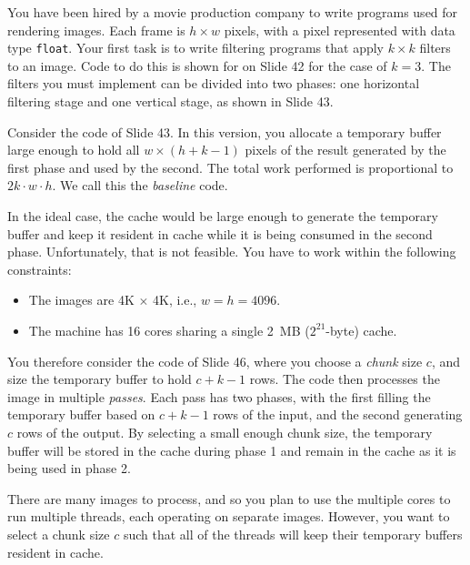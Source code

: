 \documentclass[11pt]{article}
\begin{document}
You have been hired by a movie production company to write programs
used for rendering images.  Each frame is $h \times w$ pixels, with a
pixel represented with data type \texttt{float}.  Your first task is
to write filtering programs that apply $k \times k$ filters to an
image.  Code to do this is shown for on Slide 42 for the case of
$k=3$.  The filters you must implement can be divided into two phases:
one horizontal filtering stage and one vertical stage, as shown in
Slide 43.

Consider the code of Slide 43.  In this version, you
allocate a temporary buffer large enough to hold all $w \times
(h+k-1)$ pixels of the result generated by the first phase and used by
the second.  The total work performed is proportional to $2k
\cdot w \cdot h$.  We call this the {\em baseline} code.

In the ideal case, the cache would be large enough to generate the
temporary buffer and keep it resident in cache while it is being
consumed in the second phase.
Unfortunately, that is not feasible.  You have to work within the following constraints:
\begin{itemize}
\item The images are 4K $\times$ 4K, i.e., $w = h = 4096$.
\item The machine has 16 cores sharing a single 2~MB ($2^{21}$-byte)
cache.
\end{itemize}

You therefore consider the code of Slide 46, where you choose a {\em
  chunk} size $c$, and size the temporary buffer to hold $c + k-1$
rows.  The code then processes the image in multiple {\em passes}.
Each pass has two phases, with the first filling the temporary buffer
based on $c+k-1$ rows of the input, and the second generating $c$ rows
of the output.  By selecting a small enough chunk size, the temporary
buffer will be stored in the cache during phase 1 and remain in the
cache as it is being used in phase 2.

There are many images to process, and so you plan to use the multiple
cores to run multiple threads, each operating on separate images.
However, you want to select a chunk size $c$ such that all of the
threads will keep their temporary buffers resident in cache.

\newpage
\end{document}
